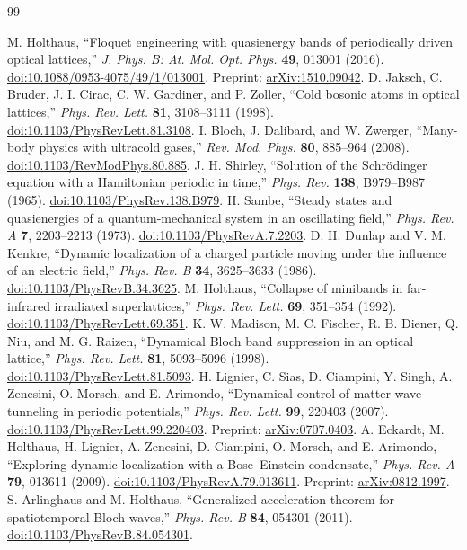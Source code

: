 \documentclass[11pt,oneside]{report}
\numberwithin{equation}{chapter}
\begin{document}
\begin{thebibliography}{99}
 M. Holthaus, ``Floquet engineering with quasienergy bands of periodically driven optical lattices,'' \emph{J. Phys. B: At. Mol. Opt. Phys.} \textbf{49}, 013001 (2016). \href{https://doi.org/10.1088/0953-4075/49/1/013001}{doi:10.1088/0953-4075/49/1/013001}. Preprint: \href{https://arxiv.org/abs/1510.09042}{arXiv:1510.09042}.
 D. Jaksch, C. Bruder, J. I. Cirac, C. W. Gardiner, and P. Zoller, ``Cold bosonic atoms in optical lattices,'' \emph{Phys. Rev. Lett.} \textbf{81}, 3108--3111 (1998). \href{https://doi.org/10.1103/PhysRevLett.81.3108}{doi:10.1103/PhysRevLett.81.3108}.
 I. Bloch, J. Dalibard, and W. Zwerger, ``Many-body physics with ultracold gases,'' \emph{Rev. Mod. Phys.} \textbf{80}, 885--964 (2008). \href{https://doi.org/10.1103/RevModPhys.80.885}{doi:10.1103/RevModPhys.80.885}.
 J. H. Shirley, ``Solution of the Schr\"odinger equation with a Hamiltonian periodic in time,'' \emph{Phys. Rev.} \textbf{138}, B979--B987 (1965). \href{https://doi.org/10.1103/PhysRev.138.B979}{doi:10.1103/PhysRev.138.B979}.
 H. Sambe, ``Steady states and quasienergies of a quantum-mechanical system in an oscillating field,'' \emph{Phys. Rev. A} \textbf{7}, 2203--2213 (1973). \href{https://doi.org/10.1103/PhysRevA.7.2203}{doi:10.1103/PhysRevA.7.2203}.
 D. H. Dunlap and V. M. Kenkre, ``Dynamic localization of a charged particle moving under the influence of an electric field,'' \emph{Phys. Rev. B} \textbf{34}, 3625--3633 (1986). \href{https://doi.org/10.1103/PhysRevB.34.3625}{doi:10.1103/PhysRevB.34.3625}.
 M. Holthaus, ``Collapse of minibands in far-infrared irradiated superlattices,'' \emph{Phys. Rev. Lett.} \textbf{69}, 351--354 (1992). \href{https://doi.org/10.1103/PhysRevLett.69.351}{doi:10.1103/PhysRevLett.69.351}.
 K. W. Madison, M. C. Fischer, R. B. Diener, Q. Niu, and M. G. Raizen, ``Dynamical Bloch band suppression in an optical lattice,'' \emph{Phys. Rev. Lett.} \textbf{81}, 5093--5096 (1998). \href{https://doi.org/10.1103/PhysRevLett.81.5093}{doi:10.1103/PhysRevLett.81.5093}.
 H. Lignier, C. Sias, D. Ciampini, Y. Singh, A. Zenesini, O. Morsch, and E. Arimondo, ``Dynamical control of matter-wave tunneling in periodic potentials,'' \emph{Phys. Rev. Lett.} \textbf{99}, 220403 (2007). \href{https://doi.org/10.1103/PhysRevLett.99.220403}{doi:10.1103/PhysRevLett.99.220403}. Preprint: \href{https://arxiv.org/abs/0707.0403}{arXiv:0707.0403}.
 A. Eckardt, M. Holthaus, H. Lignier, A. Zenesini, D. Ciampini, O. Morsch, and E. Arimondo, ``Exploring dynamic localization with a Bose--Einstein condensate,'' \emph{Phys. Rev. A} \textbf{79}, 013611 (2009). \href{https://doi.org/10.1103/PhysRevA.79.013611}{doi:10.1103/PhysRevA.79.013611}. Preprint: \href{https://arxiv.org/abs/0812.1997}{arXiv:0812.1997}.
 S. Arlinghaus and M. Holthaus, ``Generalized acceleration theorem for spatiotemporal Bloch waves,'' \emph{Phys. Rev. B} \textbf{84}, 054301 (2011). \href{https://doi.org/10.1103/PhysRevB.84.054301}{doi:10.1103/PhysRevB.84.054301}.
\end{thebibliography}
\end{document}
